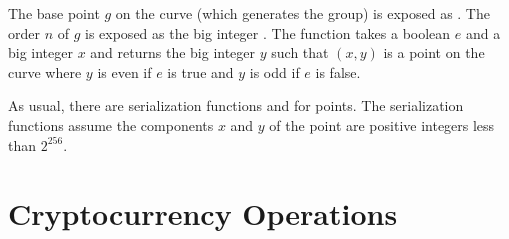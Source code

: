 The base point $g$ on the curve (which generates the group) is exposed as {}.
The order $n$ of $g$ is exposed as the big integer {}.
The function {} takes a boolean $e$ and a big integer $x$
and returns the big integer $y$ such that $(x,y)$ is a point on the curve
where $y$ is even if $e$ is true
and $y$ is odd if $e$ is false.

As usual, there are serialization functions {} and {} for
points. The serialization functions assume the components $x$ and $y$ of the point
are positive integers less than $2^{256}$.

\section{Cryptocurrency Operations}

